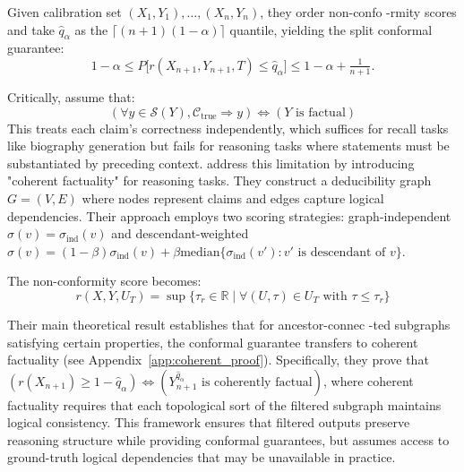 \documentclass{uai2026} %
\theoremstyle{remark}
\theoremstyle{plain}
\theoremstyle{definition}
\begin{document}
Given calibration set $(X_1,Y_1),\ldots,(X_n,Y_n)$, 
they order non-confo
-rmity scores and take $\hat{q}_\alpha$ 
as the $\lceil (n+1)(1-\alpha) \rceil$ quantile, 
yielding the split conformal guarantee:
\[
1-\alpha \leq 
P\big[r(X_{n+1},Y_{n+1},T) \leq \hat{q}_\alpha\big] 
\leq 1-\alpha+\tfrac{1}{n+1}.
\]


Critically, \citet{mohri2024language} assume that:
$$(\forall y \in \mathcal{S}(Y), \mathcal{C}_{\text{true}} \Rightarrow y) \Leftrightarrow (Y \text{ is factual})$$
This treats each claim's correctness independently, which suffices for recall tasks like biography generation but fails for reasoning tasks where statements must be substantiated by preceding context.
\citet{rubin-toles2025conformal} address this limitation by introducing "coherent factuality" for reasoning tasks. They construct a deducibility graph $G = (V,E)$ where nodes represent claims and edges capture logical dependencies. Their approach employs two scoring strategies: graph-independent $\sigma(v) = \sigma_{\text{ind}}(v)$ and descendant-weighted $\sigma(v) = (1-\beta)\sigma_{\text{ind}}(v) + \beta\text{median}\{\sigma_{\text{ind}}(v') : v' \text{ is descendant of } v\}$.

The non-conformity score becomes:
$$r(X,Y,U_T) = \sup\{\tau_r \in \mathbb{R} \mid \forall(U,\tau) \in U_T \text{ with } \tau \leq \tau_r\text{}\}$$

Their main theoretical result establishes that for ancestor-connec
-ted subgraphs satisfying certain properties, the conformal guarantee transfers to coherent factuality (see Appendix~\ref{app:coherent_proof}). Specifically, they prove that $(r(X_{n+1}) \geq 1-\hat{q}_\alpha) \Leftrightarrow (Y^{\hat{q}_\alpha}_{n+1} \text{ is coherently factual})$, where coherent factuality requires that each topological sort of the filtered subgraph maintains logical consistency. This framework ensures that filtered outputs preserve reasoning structure while providing conformal guarantees, but assumes access to ground-truth logical dependencies that may be unavailable in practice.

\end{document}

